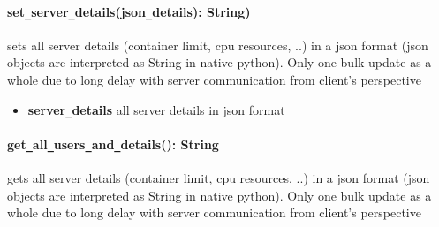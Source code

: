 \paragraph{set\texttt{\_}server\texttt{\_}details(json\texttt{\_}details): String)}
sets all server details (container limit, cpu resources, ..) in a json format
(json objects are interpreted as String in native python). Only one bulk update as a whole
due to long delay with server communication from client's perspective
\begin{itemize}
        \item \textbf{server\texttt{\_}details}
        all server details in json format
\end{itemize}

\paragraph{get\texttt{\_}all\texttt{\_}users\texttt{\_}and\texttt{\_}details(): String}
gets all server details (container limit, cpu resources, ..) in a json format
(json objects are interpreted as String in native python). Only one bulk update as a whole
due to long delay with server communication from client's perspective




